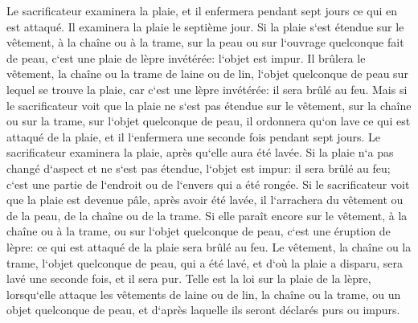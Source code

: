\verse Le sacrificateur examinera la plaie, et il enfermera pendant sept jours ce qui en est attaqué. 
\verse Il examinera la plaie le septième jour. Si la plaie s`est étendue sur le vêtement, à la chaîne ou à la trame, sur la peau ou sur l`ouvrage quelconque fait de peau, c`est une plaie de lèpre invétérée: l`objet est impur. 
\verse Il brûlera le vêtement, la chaîne ou la trame de laine ou de lin, l`objet quelconque de peau sur lequel se trouve la plaie, car c`est une lèpre invétérée: il sera brûlé au feu. 
\verse Mais si le sacrificateur voit que la plaie ne s`est pas étendue sur le vêtement, sur la chaîne ou sur la trame, sur l`objet quelconque de peau, 
\verse il ordonnera qu`on lave ce qui est attaqué de la plaie, et il l`enfermera une seconde fois pendant sept jours. 
\verse Le sacrificateur examinera la plaie, après qu`elle aura été lavée. Si la plaie n`a pas changé d`aspect et ne s`est pas étendue, l`objet est impur: il sera brûlé au feu; c`est une partie de l`endroit ou de l`envers qui a été rongée. 
\verse Si le sacrificateur voit que la plaie est devenue pâle, après avoir été lavée, il l`arrachera du vêtement ou de la peau, de la chaîne ou de la trame. 
\verse Si elle paraît encore sur le vêtement, à la chaîne ou à la trame, ou sur l`objet quelconque de peau, c`est une éruption de lèpre: ce qui est attaqué de la plaie sera brûlé au feu. 
\verse Le vêtement, la chaîne ou la trame, l`objet quelconque de peau, qui a été lavé, et d`où la plaie a disparu, sera lavé une seconde fois, et il sera pur. 
\verse Telle est la loi sur la plaie de la lèpre, lorsqu`elle attaque les vêtements de laine ou de lin, la chaîne ou la trame, ou un objet quelconque de peau, et d`après laquelle ils seront déclarés purs ou impurs. 

